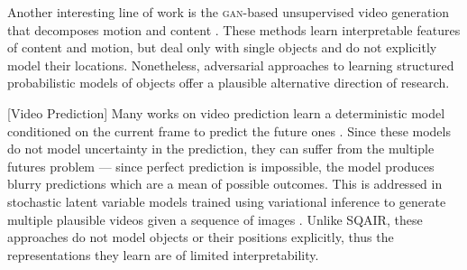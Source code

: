 	Another interesting line of work is the \textsc{gan}-based unsupervised video generation that decomposes motion and content \citep{Tulyakov2017mocogan,Denton2017unsupervised}. These methods learn interpretable features of content and motion, but deal only with single objects and do not explicitly model their locations. Nonetheless, adversarial approaches to learning structured probabilistic models of objects offer a plausible alternative direction of research.

		[Video Prediction]
	Many works on video prediction learn a deterministic model conditioned on the current frame to predict the future ones \citep{Ranzato2014video,Srivastava2015unsupervised}.
	Since these models do not model uncertainty in the prediction, they can suffer from the multiple futures problem --- since perfect prediction is impossible, the model produces blurry predictions which are a mean of possible outcomes.
	This is addressed in stochastic latent variable models trained using variational inference to generate multiple plausible videos given a sequence of images \citep{Babaeizadeh2017stochastic, Denton2018stochastic}.
	Unlike \gls{SQAIR}, these approaches do not model objects or their positions explicitly, thus the representations they learn are of limited interpretability. 
	
	
	
